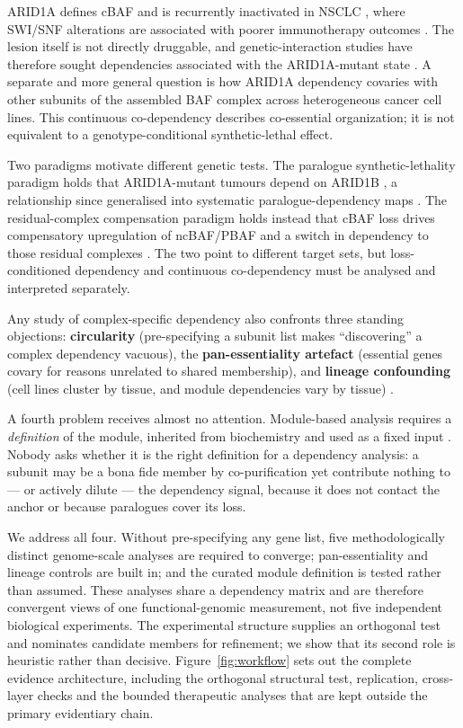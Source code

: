 \documentclass[11pt,a4paper]{article}
\begin{document}
ARID1A defines cBAF and is recurrently inactivated in NSCLC
\citep{arid1atarget2021}, where SWI/SNF alterations are associated with poorer
immunotherapy outcomes \citep{swisnfnsclc2025}. The lesion itself is not directly
druggable, and genetic-interaction studies have therefore sought dependencies
associated with the ARID1A-mutant state \citep{arid1aimmuno2024}. A separate and
more general question is how ARID1A dependency covaries with other subunits of
the assembled BAF complex across heterogeneous cancer cell lines. This
continuous co-dependency describes co-essential organization; it is not
equivalent to a genotype-conditional synthetic-lethal effect.

Two paradigms motivate different genetic tests. The
paralogue synthetic-lethality paradigm holds that ARID1A-mutant tumours depend on
ARID1B \citep{helming2014}, a relationship since generalised into systematic
paralogue-dependency maps \citep{ito2021,koferle2022}. The residual-complex
compensation paradigm holds instead that cBAF loss drives compensatory
upregulation of ncBAF/PBAF and a switch in dependency to those residual
complexes \citep{stlaurent2025}. The two point to different target sets, but loss-conditioned
dependency and continuous co-dependency must be analysed and interpreted
separately.

Any study of complex-specific dependency also confronts three standing
objections: \textbf{circularity} (pre-specifying a subunit list makes
``discovering'' a complex dependency vacuous), the \textbf{pan-essentiality
artefact} (essential genes covary for reasons unrelated to shared membership),
and \textbf{lineage confounding} (cell lines cluster by tissue, and module
dependencies vary by tissue) \citep{pan2018,wainberg2021,hassan2023}.

A fourth problem receives almost no attention. Module-based analysis requires a
\emph{definition} of the module, inherited from biochemistry and used as a fixed
input \citep{corum2023}. Nobody asks whether it is the right definition for a
dependency analysis: a subunit may be a bona fide member by co-purification yet
contribute nothing to --- or actively dilute --- the dependency signal, because it
does not contact the anchor or because paralogues cover its loss.

We address all four. Without pre-specifying any gene list, five methodologically
distinct genome-scale analyses are required to converge; pan-essentiality and
lineage controls are built in; and the curated module definition is tested
rather than assumed. These analyses share a dependency matrix and are therefore
convergent views of one functional-genomic measurement, not five independent
biological experiments. The experimental structure supplies an orthogonal test
and nominates candidate members for refinement; we show that its second role is
heuristic rather than decisive. Figure~\ref{fig:workflow} sets out the complete
evidence architecture, including the orthogonal structural test, replication,
cross-layer checks and the bounded therapeutic analyses that are kept outside
the primary evidentiary chain.
\end{document}
